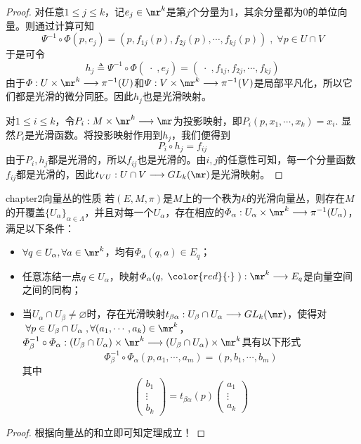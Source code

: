\begin{proof}
	对任意$1\leqslant j\leqslant k$，记$e_{j}\in \mr^{k}$是第$j$个分量为1，其余分量都为0的单位向量。则通过计算可知
	\[
	\varPsi^{-1}\circ\varPhi(p,e_{j})=(p,f_{1j}(p),f_{2j}(p),\cdots,f_{kj}(p))\;,\;\forall p\in U\cap V
	\]
	于是可令
	\[
	h_{j}\triangleq\varPsi^{-1}\circ\varPhi(\;\cdot\;,e_{j})=(\;\cdot\;,f_{1j},f_{2j},\cdots,f_{kj})
	\]
	由于$\varPhi:U\times\mr^{k}\longrightarrow \pi^{-1}(U)$和$\varPsi:V\times \mr^{k}\longrightarrow \pi^{-1}(V)$是局部平凡化，所以它们都是光滑的微分同胚。因此$h_{j}$也是光滑映射。
	
	对$1\leqslant i\leq k$，令$P_{i}:M\times \mr^{k}\longrightarrow\mr$为投影映射，即$
	P_{i}(p,x_{1},\cdots,x_{k})=x_{i}$. 显然$P_{i}$是光滑函数。将投影映射作用到$h_{j}$，我们便得到
	\[
	P_{i}\circ h_{j}= f_{ij}
	\]
	由于$P_{i},h_{j}$都是光滑的，所以$f_{ij}$也是光滑的。由$i,j$的任意性可知，每一个分量函数$f_{ij}$都是光滑的，因此$t_{VU}:U\cap V\longrightarrow GL_{k}(\mr)$是光滑映射。
\end{proof}

\begin{mythm}{}{chapter2向量丛的性质}
	若$(E,M,\pi)$是$M$上的一个秩为$k$的光滑向量丛，则存在$M$的开覆盖$\{U_{\alpha} \}_{\alpha\in \Lambda}$，并且对每一个$U_{\alpha}$，存在相应的{\color{red}{双射}}$\varPhi_{\alpha}:U_{\alpha}\times \mr^{k}\longrightarrow \pi^{-1}(U_{\alpha})$，满足以下条件：
	\begin{itemize}
		\item[(1)] $\forall q\in U_{\alpha},\forall a\in \mr^{k}$，均有$\varPhi_{\alpha}(q,a)\in E_{q}$；
		\item[(2)]  任意冻结一点$q\in U_{\alpha}$，映射$\varPhi_{\alpha}(q,\;{\color{red}{\cdot}}\;): \mr^{k}\longrightarrow E_{q}$是向量空间之间的同构；
		\item[(3)] 当$U_{\alpha}\cap U_{\beta}\neq\varnothing$时，存在光滑映射$t_{\beta\alpha}:U_{\beta}\cap U_{\alpha}\longrightarrow GL_{k}(\mr)$，使得对$\;\forall p\in U_{\beta}\cap U_{\alpha}\;,\forall(a_{1},\cdots,a_{k})\in \mr^{k}$，$\varPhi_{\beta}^{-1}\circ\varPhi_{\alpha}:(U_{\beta}\cap U_{\alpha})\times\mr^{k}\longrightarrow (U_{\beta}\cap U_{\alpha})\times\mr^{k}$具有以下形式
		\[
		\varPhi_{\beta}^{-1}\circ\varPhi_{\alpha}(p,a_{1},\cdots,a_{m})=(p,b_{1},\cdots,b_{m})
		\]
		其中
		\[
		\left( \begin{array}{ccc}{b_{1}} \\ {\vdots}  \\ {b_{k}} \end{array}\right)=t_{\beta\alpha}(p) \left( \begin{array}{ccc}{a_{1}} \\ {\vdots}  \\ {a_{k}} \end{array}\right)
		\]
	\end{itemize}
\end{mythm}
\begin{proof}
	根据向量丛的和立即可知定理成立！
\end{proof}

